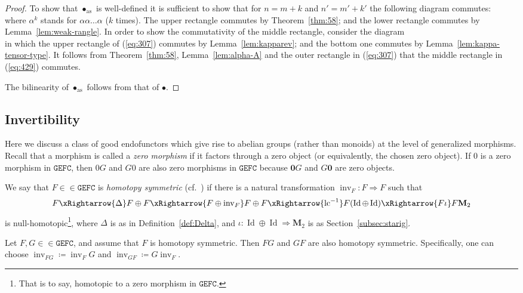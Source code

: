 \documentclass[10pt]{simplearticle}
\newcommand{\tikzinput}[1]{}
\newcommand{\as}{\operatorname{as}}
\newcommand{\Id}{\operatorname{Id}}
\newcommand{\GEFC}{\mathbb{\mathtt{GEFC}}}
\newcommand{\bzero}{\boldsymbol{0}}
\newcommand{\lc}{\operatorname{lc}}
\newcommand{\inv}{\operatorname{inv}}
\newcommand{\fM}{\mathbf{M}}
\begin{document}
\begin{proof}
To show that $\bullet_{\as}$ is well-defined it is sufficient to
show that for $n=m+k$ and $n'=m'+k'$ the following diagram commutes:
\begin{equation}
\tikzinput{d429}\label{eq:429}
\end{equation}
where $\alpha^{k}$ stands for $\alpha\alpha\dots\alpha$ ($k$ times).
The upper rectangle commutes by Theorem~\ref{thm:58}; and the lower
rectangle commutes by Lemma~\ref{lem:weak-rangle}. In order to show
the commutativity of the middle rectangle, consider the diagram
\begin{equation}
\tikzinput{d481}\label{eq:307}
\end{equation}
in which the upper rectangle of (\ref{eq:307}) commutes by Lemma~\ref{lem:kapparev};
and the bottom one commutes by Lemma~\ref{lem:kappa-tensor-type}.
It follows from Theorem~\ref{thm:58}, Lemma~\ref{lem:alpha-A}
and the outer rectangle in (\ref{eq:307}) that the middle rectangle
in (\ref{eq:429}) commutes.

The bilinearity of $\bullet_{\as}$ follows from that of $\bullet$.
\end{proof}

\subsection{Invertibility}

Here we discuss a class of good endofunctors which give rise to abelian
groups (rather than monoids) at the level of generalized morphisms.
Recall that a morphism is called a \emph{zero morphism} if it factors
through a zero object (or equivalently, the chosen zero object).
If $0$ is a zero morphism in $\GEFC$, then $0G$ and $G0$ are also
zero morphisms in $\GEFC$ because $\bzero G$ and $G\bzero$ are
zero objects.
\begin{defn}\label{def:admitinv}
We say that $F\in\in\GEFC$ is
\emph
{homotopy symmetric} (cf.~\cite[Section~5]{dadarlat1994})
if there is a natural transformation $\inv_{F}\colon F\Rightarrow F$
such that
\[
F\xRightarrow{\Delta}F\oplus F\xRightarrow{F\oplus\inv_{F}}F\oplus F\xRightarrow{\lc^{-1}}F(\Id\oplus\Id)\xRightarrow{F\iota}F\fM_{2}
\]
is null-homotopic\footnote{That is to say, homotopic to a zero morphism in $\GEFC$.},
where $\Delta$ is as in Definition~\ref{def:Delta}, and $\iota\colon\Id\oplus\Id\Rightarrow\fM_{2}$
is as Section~\ref{subsec:starig}.
\end{defn}

\begin{prop}
Let $F,G\in\in\GEFC$, and assume that $F$ is homotopy symmetric.
Then $FG$ and $GF$ are also homotopy symmetric. Specifically, one
can choose $\inv_{FG}\coloneqq\inv_{F}G$ and $\inv_{GF}\coloneqq G\inv_{F}$.
\end{prop}
\end{document}
